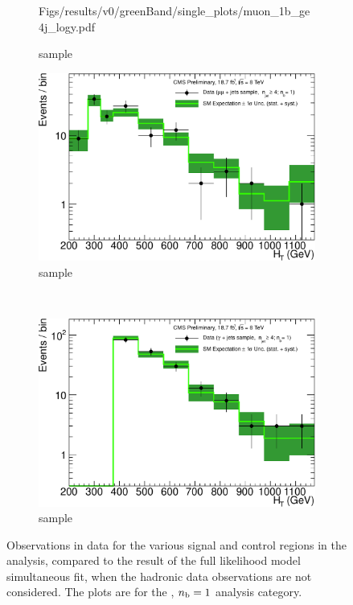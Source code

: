 \begin{figure}[h!]
\begin{subfigure}[b]{0.48\textwidth}
    {Figs/results/v0/greenBand/single_plots/muon_1b_ge4j_logy.pdf}
    \caption{\mj sample}
  \end{subfigure}
  \begin{subfigure}[b]{0.48\textwidth}
    \includegraphics[width=\textwidth]
    {Figs/results/v0/greenBand/single_plots/mumu_1b_ge4j_logy.pdf}
    \caption{\mmj sample}
  \end{subfigure}\\
  \begin{subfigure}[b]{0.48\textwidth}
    \includegraphics[width=\textwidth]
    {Figs/results/v0/greenBand/single_plots/photon_1b_ge4j_logy.pdf}
    \caption{\gj sample}
  \end{subfigure}
  \caption{Observations in data for the various signal and control
  regions in the analysis, compared to the result of the full likelihood model
  simultaneous fit, when the hadronic data observations are not considered. The
  plots are for the \njhigh, $n_{\text{b}} = 1$ analysis category.}
  \label{fig:green_fits_1b_ge4j}
\end{figure}

